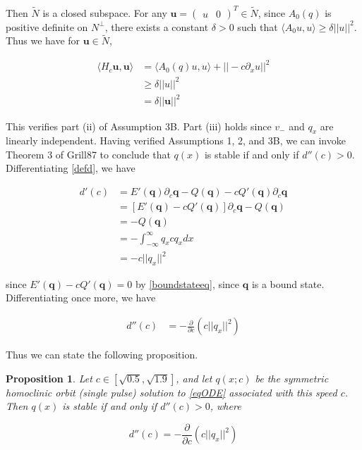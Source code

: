 \documentclass[12pt]{article}
\newtheorem{proposition}{Proposition}
\begin{document}
Then $\tilde{N}$ is a closed subspace. For any $\textbf{u} = \begin{pmatrix}u & 0\end{pmatrix}^T \in \tilde{N}$, since $A_0(q)$ is positive definite on $N^\perp$, there exists a constant $\delta > 0$ such that $\langle A_0 u, u \rangle \geq \delta ||u||^2$. Thus we have for $\textbf{u} \in \tilde{N}$,

\begin{align*}
\langle H_c \textbf{u}, \textbf{u} \rangle 
&= \langle A_0(q) u, u \rangle + || -c \partial_x u||^2 \\
&\geq \delta ||u||^2\\
&= \delta ||\textbf{u}||^2
\end{align*}

This verifies part (ii) of Assumption 3B. Part (iii) holds since $v_-$ and $q_x$ are linearly independent. Having verified Assumptions 1, 2, and 3B, we can invoke Theorem 3 of Grill87 to conclude that $q(x)$ is stable if and only if $d''(c) > 0$. Differentiating \eqref{defd}, we have

\begin{align*}
d'(c) &= E'(\textbf{q})\partial_c \textbf{q} - Q(\textbf{q}) - c Q'(\textbf{q}) \partial_c \textbf{q} \\
&= [E'(\textbf{q}) - c Q'(\textbf{q})]\partial_c \textbf{q} - Q(\textbf{q}) \\
&= - Q(\textbf{q}) \\
&= -\int_{-\infty}^\infty q_x c q_x dx \\
&= -c ||q_x||^2
\end{align*}

since $E'(\textbf{q}) - c Q'(\textbf{q}) = 0$ by \eqref{boundstateeq}, since $\textbf{q}$ is a bound state. Differentiating once more, we have

\begin{align*}
d''(c) &= -\frac{\partial}{\partial c} \left( c ||q_x||^2 \right)
\end{align*}

Thus we can state the following proposition.

\begin{proposition}\label{stabcrit}
Let $c \in [\sqrt{0.5}, \sqrt{1.9}]$, and let $q(x; c)$ be the symmetric homoclinic orbit (single pulse) solution to \eqref{eqODE} associated with this speed $c$. Then $q(x)$ is stable if and only if $d''(c) > 0$, where

\begin{equation}\label{dcc}
d''(c) = -\frac{\partial}{\partial c} \left( c ||q_x||^2 \right)
\end{equation}
\end{proposition}
\end{document}
